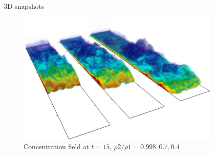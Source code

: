 \documentclass[presentation]{beamer}
\begin{document}
\begin{frame}[label={sec:org2af847c}]{3D snapshots}
\begin{figure}[htbp]
\centering
\includegraphics[width=0.9\textwidth]{./figures/3D_view.eps}
\caption{Concentration field at \(t=15\), \(\rho2/\rho1=0.998, 0.7, 0.4\)}
\end{figure}
\end{frame}
\end{document}
